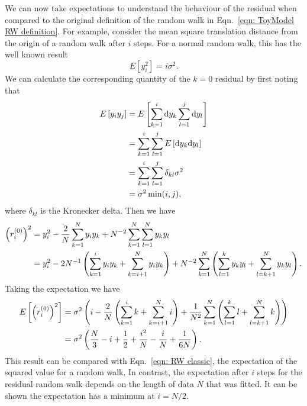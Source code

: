 \documentclass[../full_thesis/full_thesis.tex]{subfiles}
\begin{document}
\begin{subappendices}


We can now take expectations to understand the behaviour of the residual when
compared to the original definition of the random
walk in Eqn.~\ref{eqn: ToyModel RW definition}. For example, consider
the mean square translation distance from the origin of a random walk after $i$
steps. For a normal random walk, this has the well known result
\begin{equation}
E[y_{i}^{2}] = i \sigma^{2}.
\label{eqn: RW classic}
\end{equation}
We can calculate the corresponding quantity of the $k=0$ residual by first
noting that
\begin{align}
E\left[y_{i}y_{j}\right] & = E\left[\sum_{k=1}^{i}\mathrm{d} y_{k} \sum_{l=1}^{j}\mathrm{d} y_{l} \right] \\
& = \sum_{k=1}^{i}\sum_{l=1}^{j}E\left[\mathrm{d} y_{k} \mathrm{d} y_{l}\right] \\
& = \sum_{k=1}^{i}\sum_{l=1}^{j} \delta_{kl} \sigma^{2} \\
& = \sigma^{2}\min(i, j),
\label{eqn: E yiyi}
\end{align}
where $\delta_{kl}$ is the Kronecker delta. Then we have
\begin{align}
\left(r^{(0)}_{i}\right)^{2} & = y_{i}^{2} - \frac{2}{N}\sum_{k=1}^{N}y_{i}y_{k} + N^{-2}\sum_{k=1}^{N}\sum_{l=1}^{N}y_{k}y_{l} \\
& =  y_{i}^{2} - 2 N^{-1} \left(\sum_{k=1}^{i}y_{i}y_{k} + \sum_{k=i+1}^{N}y_{i}y_{k} \right)+ N^{-2}\sum_{k=1}^{N}\left(\sum_{l=1}^{k}y_{k}y_{l} + \sum_{l=k+1}^{N}y_{k}y_{l} \right).
\end{align}
Taking the expectation we have
\begin{align}
E\left[\left(r^{(0)}_{i}\right)^{2} \right] & = \sigma^{2}\left(i - \frac{2}{N}\left(\sum_{k=1}^{i}k + \sum_{k=i+1}^{N}i \right)+ \frac{1}{N^{2}}\sum_{k=1}^{N}\left(\sum_{l=1}^{k}l+ \sum_{l=k+1}^{N}k \right) \right) \\
& = \sigma^{2}\left(\frac{N}{3} - i + \frac{1}{2} + \frac{i^{2}}{N} - \frac{i}{N} + \frac{1}{6 N}\right).
\end{align}
This result can be compared with Eqn.~\eqref{eqn: RW classic}, the expectation
of the squared value for a random walk.  In contrast, the expectation after $i$
steps for the residual random walk depends on the length of data $N$ that was
fitted. It can be shown the expectation has a minimum at $i=N/2$.


\end{subappendices}
\end{document}

